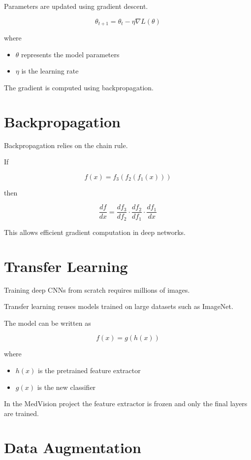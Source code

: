 ﻿\documentclass[11pt]{article}
\begin{document}
Parameters are updated using gradient descent.

\[
\theta_{t+1} = \theta_t - \eta \nabla L(\theta)
\]

where

\begin{itemize}
\item $\theta$ represents the model parameters
\item $\eta$ is the learning rate
\end{itemize}

The gradient is computed using backpropagation.

\section{Backpropagation}

Backpropagation relies on the chain rule.

If

\[
f(x) = f_3(f_2(f_1(x)))
\]

then

\[
\frac{df}{dx}
=
\frac{df_3}{df_2}
\cdot
\frac{df_2}{df_1}
\cdot
\frac{df_1}{dx}
\]

This allows efficient gradient computation in deep networks.

\section{Transfer Learning}

Training deep CNNs from scratch requires millions of images.

Transfer learning reuses models trained on large datasets such as ImageNet.

The model can be written as

\[
f(x) = g(h(x))
\]

where

\begin{itemize}
\item $h(x)$ is the pretrained feature extractor
\item $g(x)$ is the new classifier
\end{itemize}

In the MedVision project the feature extractor is frozen and only the final layers are trained.

\section{Data Augmentation}
\end{document}
